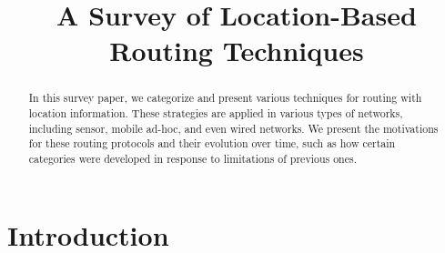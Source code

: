 \documentclass[conference]{IEEEtran}
\begin{document}
%
\title{A Survey of Location-Based Routing Techniques}

\author{
}



\maketitle



\begin{abstract}
In this survey paper, we categorize and present various techniques for routing with location information.
These strategies are applied in various types of networks, including sensor, mobile ad-hoc, and even wired networks.
We present the motivations for these routing protocols and their evolution over time, such as how certain categories were developed in response to limitations of previous ones.
\end{abstract}

%
\IEEEpeerreviewmaketitle



\section{Introduction}
\end{document}
